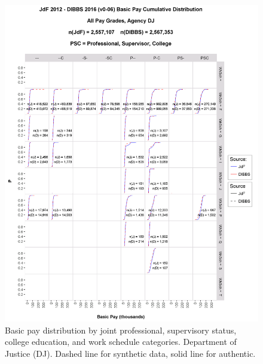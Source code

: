 \documentclass[10pt, letterpaper]{article}
\begin{document}
\begin{spacing}{1.0}
\begin{figure}[h]
    \centering
    \includegraphics[width=6.5in, trim={0 0 1in 1.5in}, clip]{JdFDIBBSBasicPayCDFDJ.png}
    \caption{Basic pay distribution by joint professional, supervisory status, college education, and work schedule  categories.  Department of Justice (DJ).  Dashed line for synthetic data, solid line for authentic.}
    \label{figure:JdFDIBBSBasicPayCDFDJ}
\end{figure}

\clearpage


\end{spacing}
\end{document}
